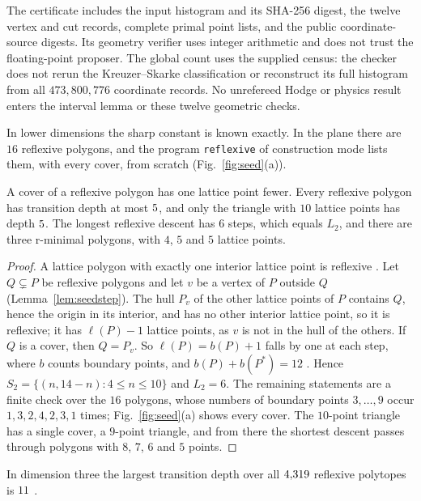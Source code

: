The certificate includes the input histogram and its SHA-256 digest,
the twelve vertex and cut records, complete primal point lists, and
the public coordinate-source digests. Its geometry verifier uses
integer arithmetic and does not trust the floating-point proposer.
The global count uses the supplied census: the checker does not
rerun the Kreuzer--Skarke classification or reconstruct its full
histogram from all $473{,}800{,}776$ coordinate records. No
unrefereed Hodge or physics result enters the interval lemma or
these twelve geometric checks.

In lower dimensions the sharp constant is known exactly. In the plane there are $16$ reflexive polygons, and the program \texttt{reflexive} of construction mode lists them, with every cover, from scratch (Fig.~\ref{fig:seed}(a)).

\begin{proposition}\label{prop:seedplane}
A cover of a reflexive polygon has one lattice point fewer. Every reflexive polygon has transition depth at most $5$, and only the triangle with $10$ lattice points has depth $5$. The longest reflexive descent has $6$ steps, which equals $L_{2}$, and there are three r-minimal polygons, with $4$, $5$ and $5$ lattice points.
\end{proposition}

\begin{proof}
A lattice polygon with exactly one interior lattice point is reflexive \cite{PRV00}. Let $Q\subsetneq P$ be reflexive polygons and let $v$ be a vertex of $P$ outside $Q$ (Lemma~\ref{lem:seedstep}). The hull $P_{v}$ of the other lattice points of $P$ contains $Q$, hence the origin in its interior, and has no other interior lattice point, so it is reflexive; it has $\ell(P)-1$ lattice points, as $v$ is not in the hull of the others. If $Q$ is a cover, then $Q=P_{v}$. So $\ell(P)=b(P)+1$ falls by one at each step, where $b$ counts boundary points, and $b(P)+b(P^{*})=12$ \cite{PRV00}. Hence $S_{2}=\{(n,14-n):4\le n\le10\}$ and $L_{2}=6$. The remaining statements are a finite check over the $16$ polygons, whose numbers of boundary points $3,\dots,9$ occur $1,3,2,4,2,3,1$ times; Fig.~\ref{fig:seed}(a) shows every cover. The $10$-point triangle has a single cover, a $9$-point triangle, and from there the shortest descent passes through polygons with $8$, $7$, $6$ and $5$ points.
\end{proof}

In dimension three the largest transition depth over all $4{,}319$ reflexive polytopes is $11$ \cite{BhaSeed}.

